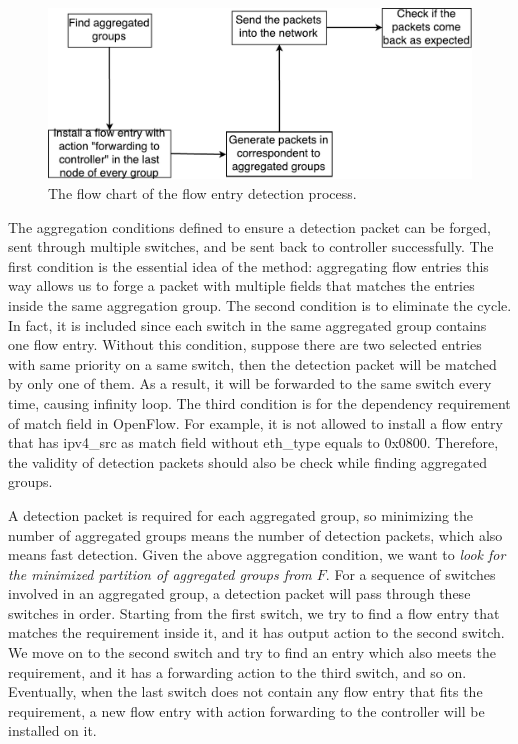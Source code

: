 \begin{figure}[H]
\begin{center} 
\includegraphics[width=1\textwidth]{figures/flow_entry_detection_flowchart.pdf}
\end{center}
\caption{The flow chart of the flow entry detection process.}
\label{flow_entry_detection_flowchart}
\end{figure}

The aggregation conditions defined to ensure a detection packet can be forged, sent through multiple switches, and be sent back to controller successfully. The first condition is the essential idea of the method: aggregating flow entries this way allows us to forge a packet with multiple fields that matches the entries inside the same aggregation group. The second condition is to eliminate the cycle. In fact, it is included since each switch in the same aggregated group contains one flow entry. Without this condition, suppose there are two selected entries with same priority on a same switch, then the detection packet will be matched by only one of them. As a result, it will be forwarded to the same switch every time, causing infinity loop. The third condition is for the dependency requirement of match field in OpenFlow. For example, it is not allowed to install a flow entry that has ipv4\_src as match field without eth\_type equals to 0x0800. Therefore, the validity of detection packets should also be check while finding aggregated groups.

A detection packet is required for each aggregated group, so minimizing the number of aggregated groups means the number of detection packets, which also means fast detection. Given the above aggregation condition, we want to \textit{look for the minimized partition of aggregated groups from $F$}. For a sequence of switches involved in an aggregated group, a detection packet will pass through these switches in order. Starting from the first switch, we try to find a flow entry that matches the requirement inside it, and it has output action to the second switch. We move on to the second switch and try to find an entry which also meets the requirement, and it has a forwarding action to the third switch, and so on. Eventually, when the last switch does not contain any flow entry that fits the requirement, a new flow entry with action forwarding to the controller will be installed on it.

